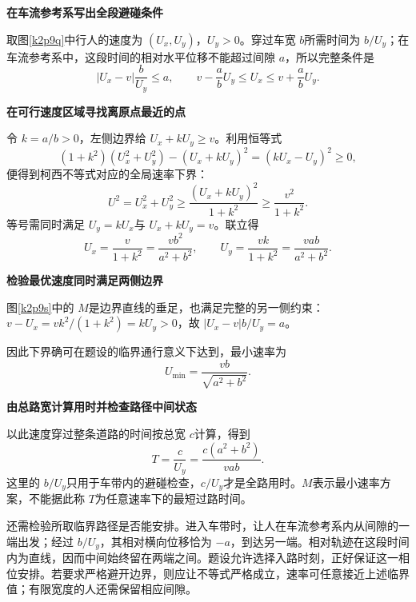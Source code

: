 \begin{solution}\textbf{在车流参考系写出全段避碰条件}\par\nobreak
取图\ref{k2p9q}中行人的速度为 $(U_x,U_y)$，$U_y>0$。穿过车宽 $b$所需时间为 $b/U_y$；在车流参考系中，这段时间的相对水平位移不能超过间隙 $a$，所以完整条件是
\[|U_x-v|\frac b{U_y}\le a,
\qquad v-\frac abU_y\le U_x\le v+\frac abU_y.\]


\par\medskip{}\noindent\textbf{在可行速度区域寻找离原点最近的点}\par\nobreak
令 $k=a/b>0$，左侧边界给 $U_x+kU_y\ge v$。利用恒等式
\[(1+k^2)(U_x^2+U_y^2)-(U_x+kU_y)^2=(kU_x-U_y)^2\ge0,\]
便得到柯西不等式对应的全局速率下界：
\[U^2=U_x^2+U_y^2
 \ge\frac{(U_x+kU_y)^2}{1+k^2}
 \ge\frac{v^2}{1+k^2}.\]
等号需同时满足 $U_y=kU_x$与 $U_x+kU_y=v$。联立得
\[U_x=\frac{v}{1+k^2}=\frac{vb^2}{a^2+b^2},\qquad
U_y=\frac{vk}{1+k^2}=\frac{vab}{a^2+b^2}.\]



\par\medskip{}\noindent\textbf{检验最优速度同时满足两侧边界}\par\nobreak
图\ref{k2p9s}中的 $M$是边界直线的垂足，也满足完整的另一侧约束：
$v-U_x=vk^2/(1+k^2)=kU_y>0$，故 $|U_x-v|b/U_y=a$。

因此下界确可在题设的临界通行意义下达到，最小速率为
\[\boxed{U_{\min}=\frac{vb}{\sqrt{a^2+b^2}}}.\]


\par\medskip{}\noindent\textbf{由总路宽计算用时并检查路径中间状态}\par\nobreak
以此速度穿过整条道路的时间按总宽 $c$计算，得到
\[\boxed{T=\frac c{U_y}=\frac{c(a^2+b^2)}{vab}}.\]
这里的 $b/U_y$只用于车带内的避碰检查，$c/U_y$才是全路用时。$M$表示最小速率方案，不能据此称 $T$为任意速率下的最短过路时间。

还需检验所取临界路径是否能安排。进入车带时，让人在车流参考系内从间隙的一端出发；经过 $b/U_y$，其相对横向位移恰为 $-a$，到达另一端。相对轨迹在这段时间内为直线，因而中间始终留在两端之间。题设允许选择入路时刻，正好保证这一相位安排。若要求严格避开边界，则应让不等式严格成立，速率可任意接近上述临界值；有限宽度的人还需保留相应间隙。
\end{solution}

